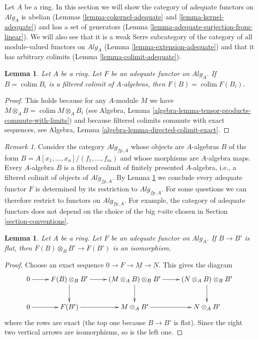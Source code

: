 \documentclass{stacks-project}
\theoremstyle{plain}
\newtheorem{lemma}[subsection]{Lemma}
\theoremstyle{definition}
\theoremstyle{remark}
\newtheorem{remark}[subsection]{Remark}
\numberwithin{equation}{subsection}
\def\colim{\mathop{\mathrm{colim}}\nolimits}
\begin{document}
\medskip\noindent
Let $A$ be a ring. In this section we will show the category of adequate
functors on $\textit{Alg}_A$ is abelian
(Lemmas \ref{lemma-cokernel-adequate} and \ref{lemma-kernel-adequate})
and has a set of generators
(Lemma \ref{lemma-adequate-surjection-from-linear}).
We will also see that it is a weak Serre subcategory of the category
of all module-valued functors on $\textit{Alg}_A$
(Lemma \ref{lemma-extension-adequate})
and that it has arbitrary colimits
(Lemma \ref{lemma-colimit-adequate}).

\begin{lemma}
\label{lemma-adequate-finite-presentation}
Let $A$ be a ring.
Let $F$ be an adequate functor on $\textit{Alg}_A$.
If $B = \colim B_i$ is a filtered
colimit of $A$-algebras, then $F(B) = \colim F(B_i)$.
\end{lemma}

\begin{proof}
This holds because for any $A$-module $M$ we have
$M \otimes_A B = \colim M \otimes_A B_i$ (see
Algebra, Lemma \ref{algebra-lemma-tensor-products-commute-with-limits})
and because filtered colimits commute with exact sequences, see
Algebra, Lemma \ref{algebra-lemma-directed-colimit-exact}.
\end{proof}

\begin{remark}
\label{remark-settheoretic}
Consider the category $\textit{Alg}_{fp, A}$ whose objects are $A$-algebras
$B$ of the form $B = A[x_1, \ldots, x_n]/(f_1, \ldots, f_m)$ and whose
morphisms are $A$-algebra maps. Every $A$-algebra $B$ is a filtered colimit
of finitely presented $A$-algebra, i.e., a filtered colimit of objects of
$\textit{Alg}_{fp, A}$. By
Lemma \ref{lemma-adequate-finite-presentation}
we conclude every adequate functor $F$ is determined by its restriction to
$\textit{Alg}_{fp, A}$. For some questions we can therefore restrict to
functors on $\textit{Alg}_{fp, A}$. For example, the category of adequate
functors does not depend on the choice of the big $\tau$-site
chosen in
Section \ref{section-conventions}.
\end{remark}

\begin{lemma}
\label{lemma-adequate-flat}
Let $A$ be a ring.
Let $F$ be an adequate functor on $\textit{Alg}_A$.
If $B \to B'$ is flat, then $F(B) \otimes_B B' \to F(B')$
is an isomorphism.
\end{lemma}

\begin{proof}
Choose an exact sequence $0 \to F \to \underline{M} \to \underline{N}$.
This gives the diagram
$$
\xymatrix{
0 \ar[r] & F(B) \otimes_B B' \ar[r] \ar[d] &
(M \otimes_A B)\otimes_B B' \ar[r] \ar[d] &
(N \otimes_A B)\otimes_B B' \ar[d] \\
0 \ar[r] & F(B') \ar[r] &
M \otimes_A B' \ar[r] &
N \otimes_A B'
}
$$
where the rows are exact (the top one because $B \to B'$ is flat).
Since the right two vertical arrows are isomorphisms, so is the
left one.
\end{proof}
\end{document}
